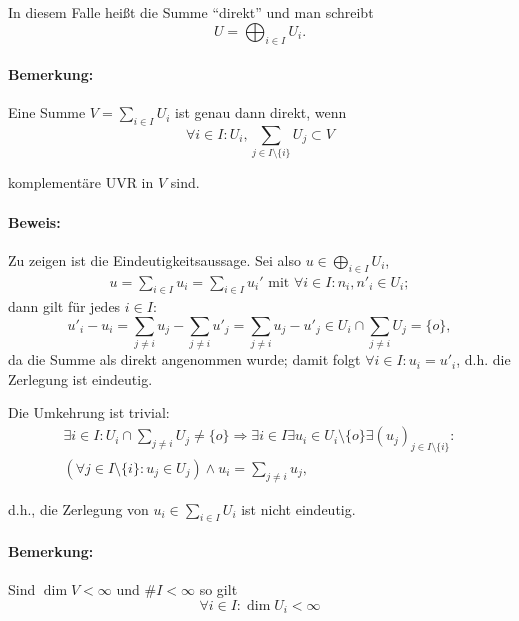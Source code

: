 	In diesem Falle heißt die Summe "`direkt"' und man schreibt
	\[ U = \bigoplus_{i\in I} U_i. \]
		
\paragraph{Bemerkung: }
	Eine Summe $ V = \sum_{i\in I} U_i $ ist genau dann direkt, wenn
		\begin{equation*}
		\forall i\in I: U_i, \sum_{j\in I\setminus\{i\}}U_j \subset V
		\end{equation*}
		
	komplementäre UVR in $ V $ sind.

\paragraph{Beweis: }
	Zu zeigen ist die Eindeutigkeitsaussage. Sei also $ u \in \bigoplus_{i\in I}U_i $,
		\begin{gather*}
		u = \sum_{i\in I} u_i = \sum_{i\in I} u_i' \text{ mit } \forall i\in I: n_i,n'_i\in U_i;
		\end{gather*}
	dann gilt für jedes $ i\in I$:
		\begin{equation*}
		u'_i-u_i = \sum _{j\neq i}u_j-\sum_{j\neq i} u'_j = \sum_{j\neq i}u_j-u'_j \in U_i\cap \sum_{j\neq i} U_j = \{o\},
		\end{equation*}
	da die Summe als direkt angenommen wurde; damit folgt $ \forall i \in I: u_i = u'_i $, d.h. die Zerlegung ist eindeutig.
	
	Die Umkehrung ist trivial:
		\begin{gather*}
		\exists i\in I:U_i\cap \sum_{j\neq i} U_j \neq \{o\} \Rightarrow \exists i\in I\exists u_i\in U_i\setminus\{o\}\exists (u_j)_{j\in I\setminus\{i\}}:\\
		(\forall j\in I\setminus\{i\}:u_j \in U_j)\land u_i = \sum_{j\neq i} u_j,
		\end{gather*}
		
	d.h., die Zerlegung von $ u_i\in \sum_{i\in I}U_i $ ist nicht eindeutig.

\paragraph{Bemerkung: }
	Sind $ \dim V <\infty $ und $ \# I < \infty $ so gilt
		\begin{equation*}
		\forall i\in I: \dim U_i < \infty
		\end{equation*}
		

